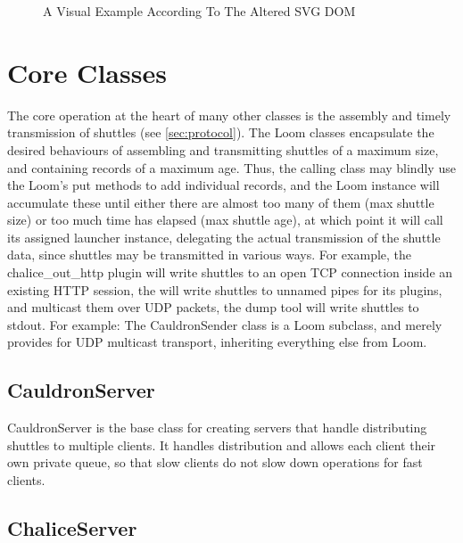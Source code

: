 \begin{figure}[htbp]
	\centering {}
	\caption{A Visual Example According To The Altered SVG DOM}
	\label{fig:visualexample}
\end{figure}

\lstset{ numbers=none,numbersep=0pt,tabsize=2,breaklines=true,resetmargins=true,linewidth=\textwidth }

\section{Core Classes}

The core operation at the heart of many other classes is the assembly and
timely transmission of \rawproto{} shuttles (see \ref{sec:protocol}).
The Loom classes encapsulate the desired behaviours of assembling and
transmitting shuttles of a maximum size, and containing records of
a maximum age. Thus, the calling class may blindly use the Loom's put
methods to add individual records, and the Loom instance will accumulate
these until either there are almost too many of them (max shuttle size)
or too much time has elapsed (max shuttle age), at which point it will
call its assigned launcher instance, delegating the actual transmission of
the shuttle data, since shuttles may be transmitted in various ways. For
example, the chalice\_out\_http plugin will write shuttles to an open
TCP connection inside an existing HTTP session, the \coven{} will write
shuttles to unnamed pipes for its plugins, and multicast them over
UDP packets, the dump tool will write shuttles to stdout. For example:
The CauldronSender class is a Loom subclass, and merely provides for
UDP multicast transport, inheriting everything else from Loom.

\subsection{CauldronServer}

CauldronServer is the base class for creating servers that handle
distributing shuttles to multiple clients. It handles distribution and
allows each client their own private queue, so that slow clients do not
slow down operations for fast clients.

\subsection{ChaliceServer}

